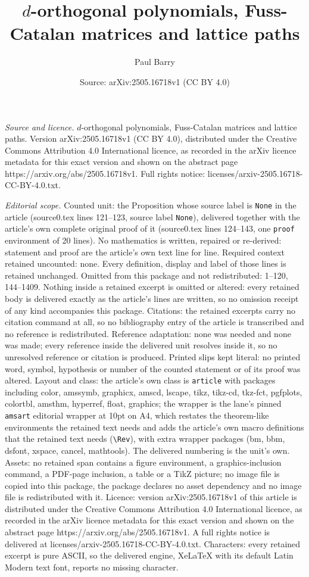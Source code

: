 \documentclass[10pt,a4paper]{amsart}
\title[$d$-orthogonal polynomials, Fuss-Catalan matrices and lattic]{$d$-orthogonal polynomials, Fuss-Catalan matrices and lattice paths}
\author{Paul Barry}
\date{Source: arXiv:2505.16718v1 (CC BY 4.0)}
\begin{document}
\maketitle

\noindent\emph{Source and licence.} $d$-orthogonal polynomials, Fuss-Catalan matrices and lattice paths. Version arXiv:2505.16718v1 (CC BY 4.0), distributed under the Creative Commons Attribution 4.0 International licence, as recorded in the arXiv licence metadata for this exact version and shown on the abstract page https://arxiv.org/abs/2505.16718v1. Full rights notice: licenses/arxiv-2505.16718-CC-BY-4.0.txt.\par\smallskip

\noindent\textit{Editorial scope.} Counted unit: the Proposition whose source label is \texttt{None} in the article (source0.tex lines 121--123, source label \texttt{None}), delivered together with the article's own complete original proof of it (source0.tex lines 124--143, one \texttt{proof} environment of 20 lines). No mathematics is written, repaired or re-derived: statement and proof are the article's own text line for line. Required context retained uncounted: none. Every definition, display and label of those lines is retained unchanged. Omitted from this package and not redistributed: 1--120, 144--1409. Nothing inside a retained excerpt is omitted or altered: every retained body is delivered exactly as the article's lines are written, so no omission receipt of any kind accompanies this package. Citations: the retained excerpts carry no citation command at all, so no bibliography entry of the article is transcribed and no reference is redistributed. Reference adaptation: none was needed and none was made; every reference inside the delivered unit resolves inside it, so no unresolved reference or citation is produced. Printed slips kept literal: no printed word, symbol, hypothesis or number of the counted statement or of its proof was altered. Layout and class: the article's own class is \texttt{article} with packages including color, amssymb, graphicx, amscd, lscape, tikz, tikz-cd, tkz-fct, pgfplots, colortbl, amsthm, hyperref, float, graphics; the wrapper is the lane's pinned \texttt{amsart} editorial wrapper at 10pt on A4, which restates the theorem-like environments the retained text needs and adds the article's own macro definitions that the retained text needs (\texttt{\textbackslash Rev}), with extra wrapper packages (bm, bbm, dsfont, xspace, cancel, mathtools). The delivered numbering is the unit's own. Assets: no retained span contains a figure environment, a graphics-inclusion command, a PDF-page inclusion, a table or a TikZ picture; no image file is copied into this package, the package declares no asset dependency and no image file is redistributed with it. Licence: version arXiv:2505.16718v1 of this article is distributed under the Creative Commons Attribution 4.0 International licence, as recorded in the arXiv licence metadata for this exact version and shown on the abstract page https://arxiv.org/abs/2505.16718v1. A full rights notice is delivered at licenses/arxiv-2505.16718-CC-BY-4.0.txt. Characters: every retained excerpt is pure ASCII, so the delivered engine, XeLaTeX with its default Latin Modern text font, reports no missing character.
\end{document}
